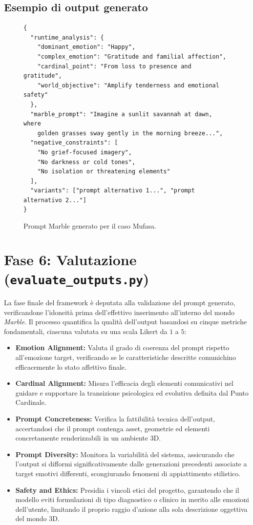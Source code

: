 \documentclass[11pt]{report}
\begin{document}
\subsection{Esempio di output generato}
 
\begin{figure}[H]
\begin{verbatim}
{
  "runtime_analysis": {
    "dominant_emotion": "Happy",
    "complex_emotion": "Gratitude and familial affection",
    "cardinal_point": "From loss to presence and gratitude",
    "world_objective": "Amplify tenderness and emotional safety"
  },
  "marble_prompt": "Imagine a sunlit savannah at dawn, where
    golden grasses sway gently in the morning breeze...",
  "negative_constraints": [
    "No grief-focused imagery",
    "No darkness or cold tones",
    "No isolation or threatening elements"
  ],
  "variants": ["prompt alternativo 1...", "prompt alternativo 2..."]
}
\end{verbatim}
\caption{Prompt Marble generato per il caso Mufasa.}
\end{figure} 
 
\section{Fase 6: Valutazione (\texttt{evaluate\_outputs.py})}

La fase finale del framework è deputata alla validazione del prompt generato, verificandone l'idoneità prima dell'effettivo inserimento all'interno del mondo \textit{Marble}. Il processo quantifica la qualità dell'output basandosi su cinque metriche fondamentali, ciascuna valutata su una scala Likert da $1$ a $5$:

\begin{itemize}
    \item \textbf{Emotion Alignment:} Valuta il grado di coerenza del prompt rispetto all'emozione target, verificando se le caratteristiche descritte comunichino efficacemente lo stato affettivo finale.
    \item \textbf{Cardinal Alignment:} Misura l'efficacia degli elementi comunicativi nel guidare e supportare la transizione psicologica ed evolutiva definita dal Punto Cardinale.
    \item \textbf{Prompt Concreteness:} Verifica la fattibilità tecnica dell'output, accertandosi che il prompt contenga asset, geometrie ed elementi concretamente renderizzabili in un ambiente 3D.
    \item \textbf{Prompt Diversity:} Monitora la variabilità del sistema, assicurando che l'output si difformi significativamente dalle generazioni precedenti associate a target emotivi differenti, scongiurando fenomeni di appiattimento stilistico.
    \item \textbf{Safety and Ethics:} Presidia i vincoli etici del progetto, garantendo che il modello eviti formulazioni di tipo diagnostico o clinico in merito alle emozioni dell'utente, limitando il proprio raggio d'azione alla sola descrizione oggettiva del mondo 3D.
\end{itemize}
 
\end{document}
